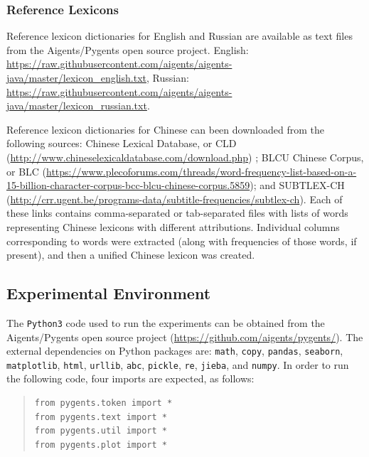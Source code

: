 \documentclass[11pt]{article}
\begin{document}
\subsubsection{Reference Lexicons}

Reference lexicon dictionaries for English and Russian are available as text files from the Aigents/Pygents open source project. English: \url{https://raw.githubusercontent.com/aigents/aigents-java/master/lexicon_english.txt}, Russian: \url{https://raw.githubusercontent.com/aigents/aigents-java/master/lexicon_russian.txt}.

Reference lexicon dictionaries for Chinese can been downloaded from the following sources: Chinese Lexical Database, or CLD (\url{http://www.chineselexicaldatabase.com/download.php}) \citep[see][]{16};  BLCU Chinese Corpus, or BLC (\url{https://www.plecoforums.com/threads/word-frequency-list-based-on-a-15-billion-character-corpus-bcc-blcu-chinese-corpus.5859}); and SUBTLEX-CH (\url{http://crr.ugent.be/programs-data/subtitle-frequencies/subtlex-ch}). Each of these links contains comma-separated or tab-separated files with lists of words representing Chinese lexicons with different attributions. Individual columns corresponding to words were extracted (along with frequencies of those words, if present), and then a unified Chinese lexicon was created.

\subsection{Experimental Environment}

The \texttt{Python3} code used to run the experiments can be obtained from the Aigents/Pygents open source project (\url{https://github.com/aigents/pygents/}). The external dependencies on Python packages are: \texttt{math}, \texttt{copy}, \texttt{pandas}, \texttt{seaborn}, \texttt{matplotlib}, \texttt{html}, \texttt{urllib}, \texttt{abc}, \texttt{pickle}, \texttt{re}, \texttt{jieba}, and \texttt{numpy}. In order to run the following code, four imports are expected, as follows:

\begin{quote}\begin{small}
\begin{verbatim}
from pygents.token import *
from pygents.text import *
from pygents.util import *
from pygents.plot import *
\end{verbatim}
\end{small}\end{quote}
\end{document}

